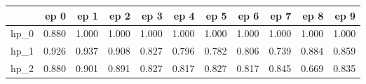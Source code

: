 \begin{tabular}{lrrrrrrrrrr}
\toprule
{} &   ep 0 &   ep 1 &   ep 2 &   ep 3 &   ep 4 &   ep 5 &   ep 6 &   ep 7 &   ep 8 &   ep 9 \\
\midrule
hp\_0 &  0.880 &  1.000 &  1.000 &  1.000 &  1.000 &  1.000 &  1.000 &  1.000 &  1.000 &  1.000 \\
hp\_1 &  0.926 &  0.937 &  0.908 &  0.827 &  0.796 &  0.782 &  0.806 &  0.739 &  0.884 &  0.859 \\
hp\_2 &  0.880 &  0.901 &  0.891 &  0.827 &  0.817 &  0.827 &  0.817 &  0.845 &  0.669 &  0.835 \\
\bottomrule
\end{tabular}
